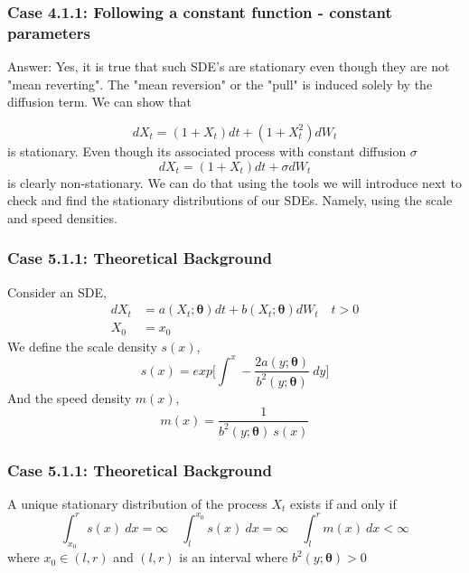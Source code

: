 \documentclass[aspectratio=169]{beamer}\usepackage[utf8]{inputenc}
\begin{document}
\begin{frame}\frametitle{ Case 4.1.1: Following a constant function - constant parameters }

Answer: Yes, it is true that such SDE's are stationary even though they are not "mean reverting". The  "mean reversion" or the "pull" is induced solely by the diffusion term. We can show that 

\begin{equation}
dX_t = (1+X_t)dt + (1+X_t^2) dW_t
\end{equation} 
is stationary. Even though its associated process with constant diffusion $\sigma$
\begin{equation}
dX_t = (1+X_t)dt + \sigma dW_t
\end{equation}
is clearly non-stationary. We can do that using the tools we will introduce next to check and find the stationary distributions of our SDEs. Namely, using the scale and speed densities. 
\end{frame}




\begin{frame}\frametitle{ Case 5.1.1: Theoretical Background }
Consider an SDE,
\begin{equation}
\begin{split}
dX_t &= a(X_t; \bm{\theta}) dt + b (X_t; \bm{\theta} ) dW_t \quad t > 0 \\
X_0 & = x_0
\end{split}\label{main}
\end{equation}
We define the scale density $s(x)$,
\begin{equation}
s(x) = exp \Big[ \int^x - \frac{2  a(y; \bm{\theta})}{b^2 (y; \bm{\theta} )}\ dy \Big]
\end{equation}
And the speed density $m(x)$,
\begin{equation}
m(x) = \frac{1}{b^2 (y; \bm{\theta}) \  s(x)}
\end{equation}
 
\end{frame}

\begin{frame}\frametitle{ Case 5.1.1: Theoretical Background }


A unique stationary distribution of the process $X_t$ exists if and only if 
\begin{equation}
\int_{x_0}^r s(x) \ dx = \infty \quad \int_{l}^{x_0} s(x) \ dx = \infty \quad \int_l^r m(x) \ dx < \infty
\end{equation}
where $x_0 \in (l,r)$ and $(l,r)$ is an interval where $b^2 (y; \bm{\theta} ) > 0$

\end{frame}
\end{document}
